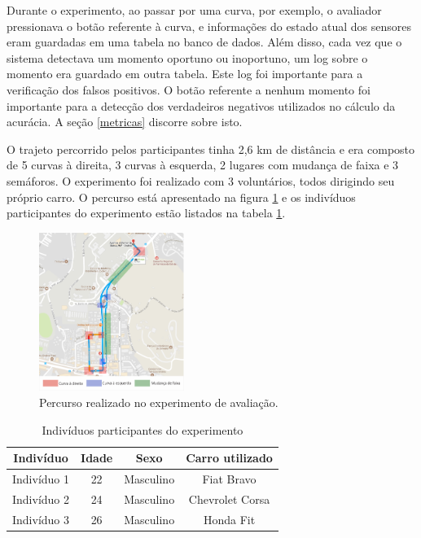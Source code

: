 Durante o experimento, ao passar por uma curva, por exemplo, o avaliador pressionava o botão
referente à curva, e informações do estado atual dos sensores eram guardadas em uma tabela no banco de dados.
Além disso, cada vez que o sistema detectava um momento oportuno ou inoportuno, um log sobre o
momento era guardado em outra tabela. Este log foi importante para a verificação dos falsos positivos.
O botão referente a nenhum momento foi importante para a detecção dos verdadeiros negativos utilizados
no cálculo da acurácia. A seção \ref{metricas} discorre sobre isto.

O trajeto percorrido pelos participantes tinha 2,6 km de distância e era composto de 5 curvas à direita,
3 curvas à esquerda, 2 lugares com mudança de faixa e 3 semáforos. O experimento foi realizado com 3
voluntários, todos dirigindo seu próprio carro. O percurso está apresentado na figura \ref{percurso} e os
indivíduos participantes do experimento estão listados na tabela \ref{participantes}.

\begin{figure}[H]
\centering
\includegraphics[width=0.42\textwidth]{images/percurso.png}
\caption{Percurso realizado no experimento de avaliação.}
\label{percurso}
\end{figure}

\begin{table}[h]
\centering
\caption{Indivíduos participantes do experimento}
\label{participantes}
\begin{tabular}{|c|c|c|c|}
\hline
\textbf{Indivíduo} & \textbf{Idade} & \textbf{Sexo} & \textbf{Carro utilizado} \\ \hline
Indivíduo 1        & 22             & Masculino     & Fiat Bravo               \\ \hline
Indivíduo 2        & 24             & Masculino     & Chevrolet Corsa          \\ \hline
Indivíduo 3        & 26             & Masculino     & Honda Fit                \\ \hline
\end{tabular}
\end{table}

